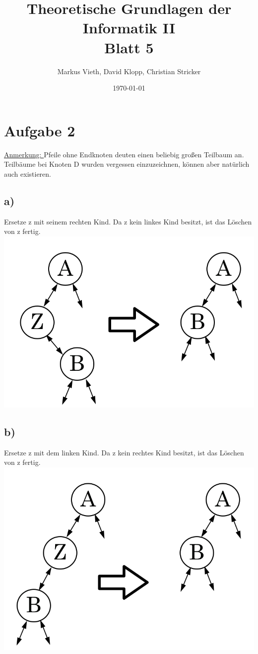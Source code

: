 \documentclass[a4paper,11pt,twoside]{article}
\title{Theoretische Grundlagen der Informatik II\\ Blatt 5}
\author{Markus Vieth, David Klopp, Christian Stricker}
\date{\today}
\begin{document}
\maketitle
\cleardoublepage
\pagestyle{myheadings}

\section*{Aufgabe 2}
\underline{Anmerkung: } Pfeile ohne Endknoten deuten einen beliebig großen Teilbaum an. Teilbäume bei Knoten D wurden vergessen einzuzeichnen, können aber natürlich auch existieren.
\subsection*{a)} Ersetze z mit seinem rechten Kind. Da z kein linkes Kind besitzt, ist das Löschen von z fertig.\\
\includegraphics*[scale=0.2]{Images/A.png}
\subsection*{b)}Ersetze z mit dem linken Kind. Da z kein rechtes Kind besitzt, ist das Löschen von z fertig.\\
\includegraphics*[scale=0.2]{Images/B.png}
\end{document}
